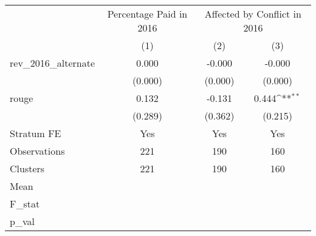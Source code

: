 {
\def\sym#1{\ifmmode^{#1}\else\(^{#1}\)\fi}
\begin{tabular}{l*{3}{c}}
\hline\hline
                &\multicolumn{1}{c}{Percentage Paid in 2016}&\multicolumn{2}{c}{Affected by Conflict in 2016}\\
                &\multicolumn{1}{c}{(1)}         &\multicolumn{1}{c}{(2)}         &\multicolumn{1}{c}{(3)}         \\
\hline
rev\_2016\_alternate&    0.000         &   -0.000         &   -0.000         \\
                &  (0.000)         &  (0.000)         &  (0.000)         \\
rouge           &    0.132         &   -0.131         &    0.444\sym{**} \\
                &  (0.289)         &  (0.362)         &  (0.215)         \\
Stratum FE      &      Yes         &      Yes         &      Yes         \\
\hline
Observations    &      221         &      190         &      160         \\
Clusters        &      221         &      190         &      160         \\
Mean            &                  &                  &                  \\
F\_stat          &                  &                  &                  \\
p\_val           &                  &                  &                  \\
\hline\hline
\end{tabular}
}
